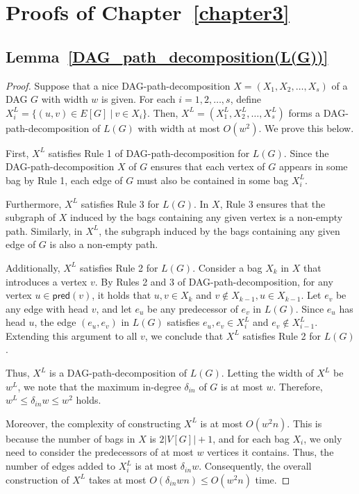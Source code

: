 \documentclass[runningheads]{llncs}
\theoremstyle{plain}
\theoremstyle{definition}
\begin{document}
\section{Proofs of Chapter~\ref{chapter3}}

\subsection{\textbf{Lemma~\ref{DAG_path_decomposition(L(G))}}}
\begin{proof}
    Suppose that a nice DAG-path-decomposition $X=(X_1, X_2, \dots, X_s)$ of a DAG $G$ with width $w$ is given. For each $i=1, 2, \dots, s$, define $X^L_i = \{(u, v) \in E[G]~|~v \in X_i \}$. Then, $X^L=(X^L_1, X^L_2, \dots, X^L_s)$ forms a DAG-path-decomposition of $L(G)$ with width at most $O(w^2)$. We prove this below. 
    
    First, $X^L$ satisfies Rule 1 of DAG-path-decomposition for $L(G)$. Since the DAG-path-decomposition $X$ of $G$ ensures that each vertex of $G$ appears in some bag by Rule 1, each edge of $G$ must also be contained in some bag $X^L_i$. 
    
    Furthermore, $X^L$ satisfies Rule 3 for $L(G)$. In $X$, Rule 3 ensures that the subgraph of $X$ induced by the bags containing any given vertex is a non-empty path. Similarly, in $X^L$, the subgraph induced by the bags containing any given edge of $G$ is also a non-empty path.
    
    Additionally, $X^L$ satisfies Rule 2 for $L(G)$. Consider a bag $X_k$ in $X$ that introduces a vertex $v$. By Rules 2 and 3 of DAG-path-decomposition, for any vertex $u \in \mathsf{pred}(v)$, it holds that $u, v \in X_k$ and $v \notin X_{k-1}, u \in X_{k-1}$. Let $e_v$ be any edge with head $v$, and let $e_u$ be any predecessor of $e_v$ in $L(G)$. Since $e_u$ has head $u$, the edge $(e_u, e_v)$ in $L(G)$ satisfies $e_u, e_v \in X^L_i$ and $e_v \notin X^L_{i-1}$. Extending this argument to all $v$, we conclude that $X^L$ satisfies Rule 2 for $L(G)$. 
    
    Thus, $X^L$ is a DAG-path-decomposition of $L(G)$. Letting the width of $X^L$ be $w^L$, we note that the maximum in-degree $\delta_{in}$ of $G$ is at most $w$. Therefore, $w^L \leq \delta_{in} w \leq w^2$ holds. 

    Moreover, the complexity of constructing $X^L$ is at most $O(w^2n)$. This is because the number of bags in $X$ is $2|V[G]|+1$, and for each bag $X_i$, we only need to consider the predecessors of at most $w$ vertices it contains. Thus, the number of edges added to $X^L_i$ is at most $\delta_{in}w$. Consequently, the overall construction of $X^L$ takes at most $O(\delta_{in}wn) \leq O(w^2n)$ time.
\end{proof}
\end{document}
